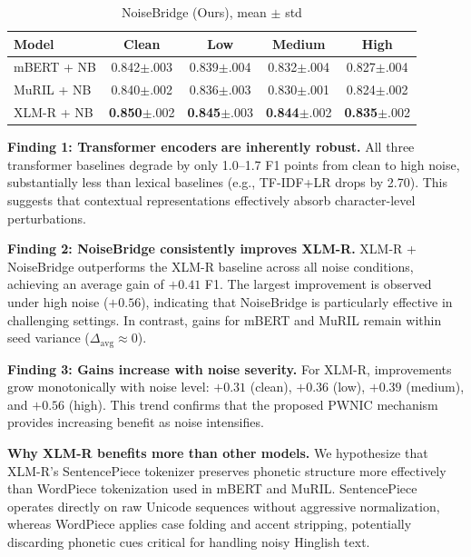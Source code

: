 \documentclass[conference]{IEEEtran}
\begin{document}
\begin{table}[H]
\caption{NoiseBridge (Ours), mean $\pm$ std}
\label{tab:noisebridge}
\centering
\small
\setlength{\tabcolsep}{3pt}
\renewcommand{\arraystretch}{1.15}
\begin{tabular}{lcccc}
\toprule
Model & Clean & Low & Medium & High \\
\midrule
mBERT + NB & 0.842$\pm$.003 & 0.839$\pm$.004 & 0.832$\pm$.004 & 0.827$\pm$.004 \\
MuRIL + NB & 0.840$\pm$.002 & 0.836$\pm$.003 & 0.830$\pm$.001 & 0.824$\pm$.002 \\
XLM-R + NB & \textbf{0.850}$\pm$.002 & \textbf{0.845}$\pm$.003 & \textbf{0.844}$\pm$.002 & \textbf{0.835}$\pm$.002 \\
\bottomrule
\end{tabular}
\end{table}

\vspace{-0.3em}

\textbf{Finding 1: Transformer encoders are inherently robust.}
All three transformer baselines degrade by only 1.0--1.7 F1 points from clean to high noise, substantially less than lexical baselines (e.g., TF-IDF+LR drops by 2.70). This suggests that contextual representations effectively absorb character-level perturbations.

\textbf{Finding 2: NoiseBridge consistently improves XLM-R.}
XLM-R + NoiseBridge outperforms the XLM-R baseline across all noise conditions, achieving an average gain of $+0.41$ F1. The largest improvement is observed under high noise ($+0.56$), indicating that NoiseBridge is particularly effective in challenging settings. In contrast, gains for mBERT and MuRIL remain within seed variance ($\Delta_{\text{avg}} \approx 0$).

\textbf{Finding 3: Gains increase with noise severity.}
For XLM-R, improvements grow monotonically with noise level: $+0.31$ (clean), $+0.36$ (low), $+0.39$ (medium), and $+0.56$ (high). This trend confirms that the proposed PWNIC mechanism provides increasing benefit as noise intensifies.

\textbf{Why XLM-R benefits more than other models.}
We hypothesize that XLM-R's SentencePiece tokenizer preserves phonetic structure more effectively than WordPiece tokenization used in mBERT and MuRIL. SentencePiece operates directly on raw Unicode sequences without aggressive normalization, whereas WordPiece applies case folding and accent stripping, potentially discarding phonetic cues critical for handling noisy Hinglish text.
\end{document}
